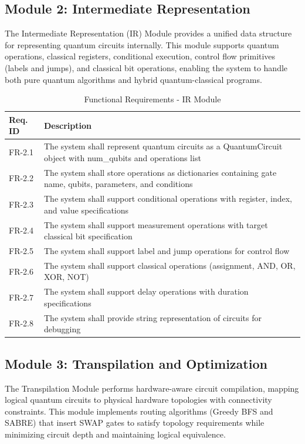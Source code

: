 \subsection{Module 2: Intermediate Representation}

The Intermediate Representation (IR) Module provides a unified data structure for representing quantum circuits internally. This module supports quantum operations, classical registers, conditional execution, control flow primitives (labels and jumps), and classical bit operations, enabling the system to handle both pure quantum algorithms and hybrid quantum-classical programs.

\begin{table}[H]
\centering
\caption{Functional Requirements - IR Module}
\begin{tabular}{|p{2cm}|p{11cm}|}
\hline
\textbf{Req. ID} & \textbf{Description} \\
\hline
FR-2.1 & The system shall represent quantum circuits as a QuantumCircuit object with num\_qubits and operations list \\
\hline
FR-2.2 & The system shall store operations as dictionaries containing gate name, qubits, parameters, and conditions \\
\hline
FR-2.3 & The system shall support conditional operations with register, index, and value specifications \\
\hline
FR-2.4 & The system shall support measurement operations with target classical bit specification \\
\hline
FR-2.5 & The system shall support label and jump operations for control flow \\
\hline
FR-2.6 & The system shall support classical operations (assignment, AND, OR, XOR, NOT) \\
\hline
FR-2.7 & The system shall support delay operations with duration specifications \\
\hline
FR-2.8 & The system shall provide string representation of circuits for debugging \\
\hline
\end{tabular}
\end{table}

\subsection{Module 3: Transpilation and Optimization}

The Transpilation Module performs hardware-aware circuit compilation, mapping logical quantum circuits to physical hardware topologies with connectivity constraints. This module implements routing algorithms (Greedy BFS and SABRE) that insert SWAP gates to satisfy topology requirements while minimizing circuit depth and maintaining logical equivalence.


